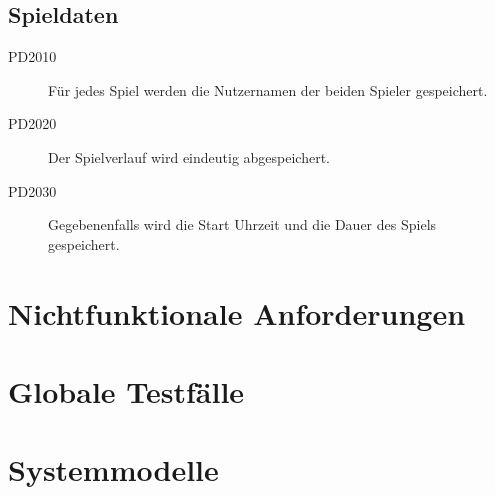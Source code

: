 \documentclass[parskip=full]{scrartcl}
\begin{document}
\subsection{Spieldaten}
\begin{description}
	
\item[PD2010] Für jedes Spiel werden die Nutzernamen der beiden Spieler gespeichert.
\item[PD2020] Der Spielverlauf wird eindeutig abgespeichert.
\item[PD2030] Gegebenenfalls wird die Start Uhrzeit und die Dauer des Spiels gespeichert.

\end{description}

\section{Nichtfunktionale Anforderungen}
\section{Globale Testfälle}
\section{Systemmodelle}
\end{document}
